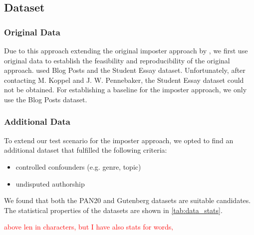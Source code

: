 \subsection{Dataset}
\label{subsec:dataset}
\newcommand{\dataGutenberg}{Gutenberg}
\newcommand{\dataBlog}{Blog Posts}
\newcommand{\dataPan}{PAN20}
\newcommand{\dataStudent}{Student Essay}

\subsubsection{Original Data}
Due to this approach extending the original imposter approach by \citet{koppel_determining_2014}, 
we first use original data to establish the feasibility and reproducibility of the original approach. 
\citet{koppel_determining_2014} used \dataBlog{} and the \dataStudent{} dataset.
Unfortunately, after contacting M. Koppel and J. W. Pennebaker, the \dataStudent{} dataset could not be obtained.
For establishing a baseline for the imposter approach, we only use the \dataBlog{} dataset.

\subsubsection{Additional Data}
To extend our test scenario for the imposter approach, we opted to find an additional dataset that fulfilled the following criteria:
\begin{itemize}
    \item controlled confounders (e.g. genre, topic)
    \item undisputed authorship 
    
\end{itemize}

We found that both the \dataPan{} and \dataGutenberg{} datasets are suitable candidates.
The statistical properties of the datasets are shown in \autoref{tab:data_stats}.

\begin{table}[h]
\centering\small
\caption{Statistics of preprocessed datasets \dataPan{}, \dataBlog{} and \dataGutenberg{}.}
\label{tab:data_stats}
\end{table}
\textcolor{red}{above len in characters, but I have also stats for words‚}


